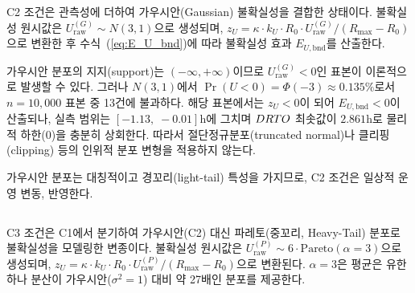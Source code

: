 C2 조건은 관측성에 더하여 가우시안(Gaussian) 불확실성을 결합한 상태이다.
불확실성 원시값은 $U_{\text{raw}}^{(G)} \sim N(3, 1)$으로 생성되며,
$z_U = \kappa \cdot k_U \cdot R_0 \cdot U_{\text{raw}}^{(G)} / (R_{\max} - R_0)$으로 변환한 후
수식~(\ref{eq:E_U_bnd})에 따라 불확실성 효과 $E_{U,\text{bnd}}$를 산출한다.

 가우시안 분포의 지지(support)는 $(-\infty, +\infty)$이므로
$U_{\text{raw}}^{(G)} < 0$인 표본이 이론적으로 발생할 수 있다.
그러나 $N(3,1)$에서 $\Pr(U < 0) = \Phi(-3) \approx 0.135\%$로서
$n = 10{,}000$ 표본 중 13건에 불과하다.
해당 표본에서는 $z_U < 0$이 되어 $E_{U,\text{bnd}} < 0$이 산출되나,
실측 범위는 $[-1.13,\; -0.01]$h에 그치며
$DRTO$ 최솟값이 $2.861$h로 물리적 하한($0$)을 충분히 상회한다.
따라서 절단정규분포(truncated normal)나 클리핑(clipping) 등의
인위적 분포 변형을 적용하지 않는다.

가우시안 분포는 대칭적이고 경꼬리(light-tail) 특성을 가지므로,
C2 조건은 일상적 운영 변동,  반영한다.



\subsection{}
\label{subsec:c3}

C3 조건은 C1에서 분기하여 가우시안(C2) 대신 파레토(중꼬리, Heavy-Tail) 분포로
불확실성을 모델링한 변종이다. 불확실성 원시값은
$U_{\text{raw}}^{(P)} \sim 6 \cdot \mathrm{Pareto}(\alpha = 3)$으로
생성되며, $z_U = \kappa \cdot k_U \cdot R_0 \cdot U_{\text{raw}}^{(P)} / (R_{\max} - R_0)$으로 변환된다.
$\alpha = 3$은 평균은 유한하나 분산이 가우시안($\sigma^2=1$) 대비 약 27배인 분포를 제공한다.

